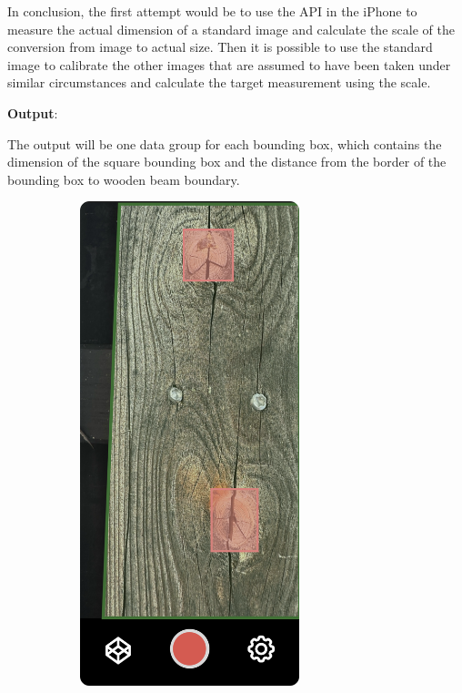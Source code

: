 In conclusion, the first attempt would be to use the API in the iPhone to measure the actual dimension of a standard image and calculate the scale of the conversion from image to actual size. Then it is possible to use the standard image to calibrate the other images that are assumed to have been taken under similar circumstances and calculate the target measurement using the scale.

\hspace*{\fill}

\textbf{Output}:

The output will be one data group for each bounding box, which contains the dimension of the square bounding box and the distance from the border of the bounding box to wooden beam boundary.

\begin{figure}[ht]
    \begin{subfigure}[b]{0.3\textwidth}
        \includegraphics[width=0.7\textwidth]{Master Thesis/Images/Section_3/Mock/3-Mock3.png}

\end{subfigure}
\end{figure}

